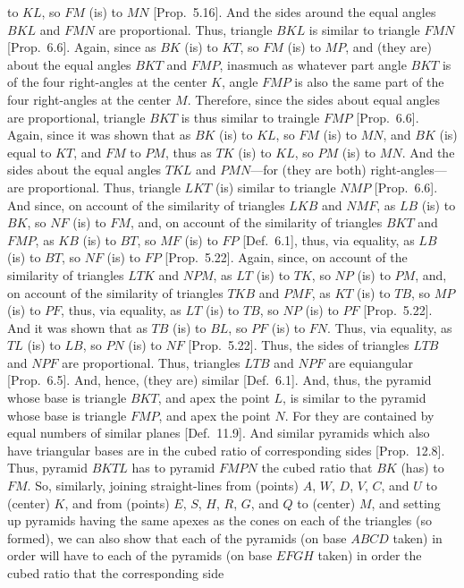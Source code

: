 \begin{Parallel}{}{}
{to $KL$, so $FM$ (is) to $MN$ [Prop.~5.16]. And the sides around the equal angles $BKL$ and
$FMN$ are proportional. Thus, triangle $BKL$ is similar to triangle $FMN$
[Prop.~6.6]. Again, since as $BK$ (is) to $KT$, so
$FM$ (is) to $MP$, and (they are) about the equal angles $BKT$ and $FMP$, inasmuch as whatever part angle $BKT$
is of the four right-angles at the center $K$, angle $FMP$ is also the same part of the four right-angles at the  center $M$. 
Therefore, since the sides about equal angles are proportional,  triangle $BKT$ is thus similar to traingle $FMP$ [Prop.~6.6].
Again, since it was shown that as $BK$ (is) to $KL$, so $FM$ (is) to $MN$, and $BK$ (is) equal to $KT$, and
$FM$ to $PM$, thus as $TK$ (is) to $KL$, so $PM$ (is) to $MN$. And the sides about the equal angles
$TKL$ and $PMN$---for (they are both) right-angles---are proportional.  Thus, triangle $LKT$ (is) similar to
triangle $NMP$ [Prop.~6.6]. And since, on account of the similarity of triangles $LKB$ and
$NMF$, as $LB$ (is) to $BK$, so $NF$ (is) to $FM$, and, on account of the  similarity of triangles $BKT$ and
$FMP$, as $KB$ (is) to $BT$, so $MF$ (is) to $FP$ [Def.~6.1], thus, via equality, as $LB$ (is)
to $BT$, so $NF$ (is) to $FP$ [Prop.~5.22]. Again, since, on account of the similarity of
triangles $LTK$ and $NPM$, as $LT$ (is) to $TK$, so $NP$ (is) to $PM$, and, on account of the similarity of
triangles $TKB$ and $PMF$, as $KT$ (is) to $TB$, so $MP$ (is) to $PF$, thus, via equality,  as $LT$ (is) to $TB$, so
$NP$ (is) to $PF$ [Prop.~5.22]. And it was shown that as $TB$ (is) to $BL$, so $PF$ (is) to $FN$.
 Thus, via equality, as $TL$ (is) to $LB$, so $PN$ (is) to $NF$ [Prop.~5.22]. Thus, the sides of triangles
 $LTB$ and $NPF$ are proportional. Thus, triangles $LTB$ and $NPF$ are equiangular [Prop.~6.5]. 
 And, hence, (they are) similar [Def.~6.1]. And, thus, the pyramid whose base is triangle $BKT$, and
 apex the point $L$, is similar to the pyramid whose base is triangle $FMP$, and apex the point $N$. For they are contained
 by equal numbers of similar planes [Def.~11.9]. And similar pyramids which also have triangular
 bases are in the cubed ratio of corresponding sides [Prop.~12.8]. Thus, pyramid
 $BKTL$ has to pyramid $FMPN$ the cubed ratio that $BK$ (has) to $FM$. So, similarly, joining
 straight-lines from (points) $A$, $W$, $D$, $V$, $C$, and $U$ to (center) $K$, and from (points) $E$, $S$, $H$, $R$,
 $G$,  and $Q$ to (center) $M$, and setting up pyramids having the same apexes as the cones on each of the triangles (so formed), we can also show
 that each of the pyramids (on base $ABCD$ taken) in order will have to each of the pyramids (on base $EFGH$ taken) in order the cubed ratio that the corresponding side
}
\end{Parallel}
